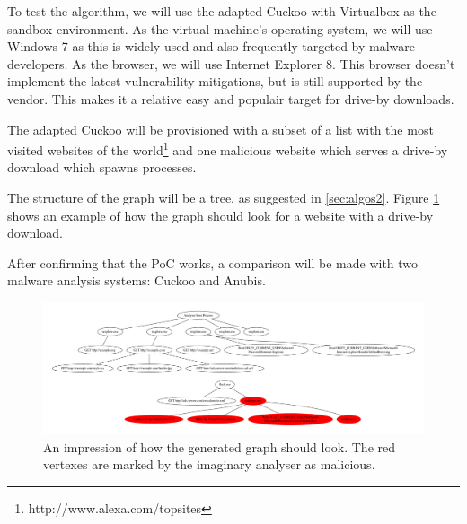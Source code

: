To test the algorithm, we will use the adapted Cuckoo with Virtualbox as the sandbox environment. As the virtual machine's operating system, we will use Windows 7 as this is widely used and also frequently targeted by malware developers. As the browser, we will use Internet Explorer 8. This browser doesn't implement the latest vulnerability mitigations, but is still supported by the vendor. This makes it a relative easy and populair target for drive-by downloads.

\pagebreak

The adapted Cuckoo will be provisioned with a subset of a list with the most visited websites of the world\footnote{http://www.alexa.com/topsites} and one malicious website which serves a drive-by download which spawns processes.

The structure of the graph will be a tree, as suggested in \ref{sec:algos2}. Figure \ref{fig:alg_tree} shows an example of how the graph should look for a website with a drive-by download.

After confirming that the PoC works, a comparison will be made with two malware analysis systems: Cuckoo and Anubis.

\pagebreak

\begin{figure}[h]
    \centering
    \centerline{\includegraphics[width=25cm,angle=90]{Images/alg_tree}}
    \caption{An impression of how the generated graph should look. The red vertexes are marked by the imaginary analyser as malicious.}
    \label{fig:alg_tree}
\end{figure}

\pagebreak

\restoregeometry
{}
\setcounter{page}{\thesavepage}
